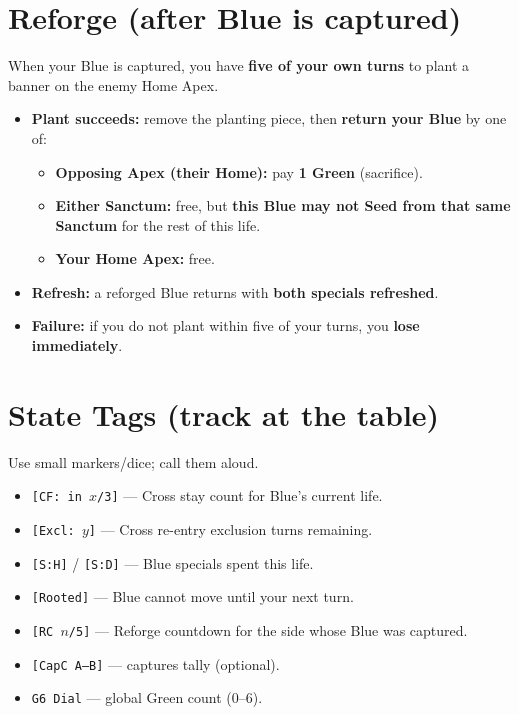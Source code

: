 \documentclass[11pt]{article}
\begin{document}
\section*{Reforge (after Blue is captured)}
When your Blue is captured, you have \textbf{five of your own turns} to plant a banner on the enemy Home Apex.
\begin{itemize}
  \item \textbf{Plant succeeds:} remove the planting piece, then \textbf{return your Blue} by one of:
    \begin{itemize}
      \item \textbf{Opposing Apex (their Home):} pay \textbf{1 Green} (sacrifice).
      \item \textbf{Either Sanctum:} free, but \textbf{this Blue may not Seed from that same Sanctum} for the rest of this life.
      \item \textbf{Your Home Apex:} free.
    \end{itemize}
  \item \textbf{Refresh:} a reforged Blue returns with \textbf{both specials refreshed}.
  \item \textbf{Failure:} if you do not plant within five of your turns, you \textbf{lose immediately}.
\end{itemize}

\section*{State Tags (track at the table)}
Use small markers/dice; call them aloud.
\begin{itemize}
  \item \texttt{[CF: in $x$/3]} — Cross stay count for Blue’s current life.
  \item \texttt{[Excl: $y$]} — Cross re-entry exclusion turns remaining.
  \item \texttt{[S:H]} / \texttt{[S:D]} — Blue specials spent this life.
  \item \texttt{[Rooted]} — Blue cannot move until your next turn.
  \item \texttt{[RC $n$/5]} — Reforge countdown for the side whose Blue was captured.
  \item \texttt{[CapC A--B]} — captures tally (optional).
  \item \texttt{G6 Dial} — global Green count (0–6).
\end{itemize}
\end{document}
